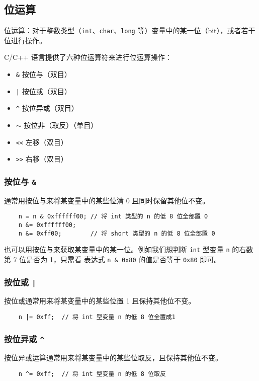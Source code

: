 \documentclass[UTF8]{ctexart}
\begin{document}
\subsection{位运算}
位运算：对于整数类型（\texttt{int}、\texttt{char}、\texttt{long} 等）变量中的某一位（bit），或者若干位进行操作。

C/C++ 语言提供了六种位运算符来进行位运算操作：
\begin{itemize}
    \item \texttt{\&} 按位与（双目）
    \item \texttt{|} 按位或（双目）
    \item \texttt{\^{}} 按位异或（双目）
    \item \texttt{$\sim$} 按位非（取反）（单目）
    \item \texttt{<<} 左移（双目）
    \item \texttt{>>} 右移（双目）
\end{itemize}

\subsubsection{按位与 \texttt{\&}}
通常用按位与来将某变量中的某些位清 0 且同时保留其他位不变。
\begin{verbatim}
    n = n & 0xffffff00; // 将 int 类型的 n 的低 8 位全部置 0
    n &= 0xffffff00;
    n &= 0xff00;        // 将 short 类型的 n 的低 8 位全部置 0
\end{verbatim}

也可以用按位与来获取某变量中的某一位。例如我们想判断 \texttt{int} 型变量 \texttt{n} 的右数第 7 位是否为 1，只需看
表达式 \texttt{n & 0x80} 的值是否等于 \texttt{0x80} 即可。

\subsubsection{按位或 \texttt{|}}
按位或通常用来将某变量中的某些位置 1 且保持其他位不变。
\begin{verbatim}
    n |= 0xff;  // 将 int 型变量 n 的低 8 位全置成1
\end{verbatim}

\subsubsection{按位异或 \texttt{\^{}}}
按位异或运算通常用来将某变量中的某些位取反，且保持其他位不变。
\begin{verbatim}
    n ^= 0xff;  // 将 int 型变量 n 的低 8 位取反
\end{verbatim}
\end{document}
